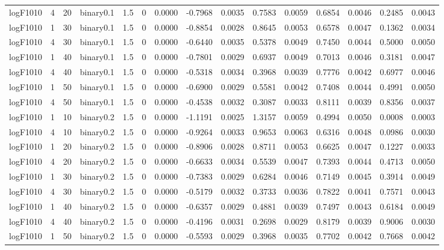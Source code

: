 \begin{longtable}{rrrrrrrrrrrrrrr}
  logF1010 & 4 & 20 & binary0.1 & 1.5 & 0 & 0.0000 & -0.7968 & 0.0035 & 0.7583 & 0.0059 & 0.6854 & 0.0046 & 0.2485 & 0.0043 \\ 
  logF1010 & 1 & 30 & binary0.1 & 1.5 & 0 & 0.0000 & -0.8854 & 0.0028 & 0.8645 & 0.0053 & 0.6578 & 0.0047 & 0.1362 & 0.0034 \\ 
  logF1010 & 4 & 30 & binary0.1 & 1.5 & 0 & 0.0000 & -0.6440 & 0.0035 & 0.5378 & 0.0049 & 0.7450 & 0.0044 & 0.5000 & 0.0050 \\ 
  logF1010 & 1 & 40 & binary0.1 & 1.5 & 0 & 0.0000 & -0.7801 & 0.0029 & 0.6937 & 0.0049 & 0.7013 & 0.0046 & 0.3181 & 0.0047 \\ 
  logF1010 & 4 & 40 & binary0.1 & 1.5 & 0 & 0.0000 & -0.5318 & 0.0034 & 0.3968 & 0.0039 & 0.7776 & 0.0042 & 0.6977 & 0.0046 \\ 
  logF1010 & 1 & 50 & binary0.1 & 1.5 & 0 & 0.0000 & -0.6900 & 0.0029 & 0.5581 & 0.0042 & 0.7408 & 0.0044 & 0.4991 & 0.0050 \\ 
  logF1010 & 4 & 50 & binary0.1 & 1.5 & 0 & 0.0000 & -0.4538 & 0.0032 & 0.3087 & 0.0033 & 0.8111 & 0.0039 & 0.8356 & 0.0037 \\ 
  logF1010 & 1 & 10 & binary0.2 & 1.5 & 0 & 0.0000 & -1.1191 & 0.0025 & 1.3157 & 0.0059 & 0.4994 & 0.0050 & 0.0008 & 0.0003 \\ 
  logF1010 & 4 & 10 & binary0.2 & 1.5 & 0 & 0.0000 & -0.9264 & 0.0033 & 0.9653 & 0.0063 & 0.6316 & 0.0048 & 0.0986 & 0.0030 \\ 
  logF1010 & 1 & 20 & binary0.2 & 1.5 & 0 & 0.0000 & -0.8906 & 0.0028 & 0.8711 & 0.0053 & 0.6625 & 0.0047 & 0.1227 & 0.0033 \\ 
  logF1010 & 4 & 20 & binary0.2 & 1.5 & 0 & 0.0000 & -0.6633 & 0.0034 & 0.5539 & 0.0047 & 0.7393 & 0.0044 & 0.4713 & 0.0050 \\ 
  logF1010 & 1 & 30 & binary0.2 & 1.5 & 0 & 0.0000 & -0.7383 & 0.0029 & 0.6284 & 0.0046 & 0.7149 & 0.0045 & 0.3914 & 0.0049 \\ 
  logF1010 & 4 & 30 & binary0.2 & 1.5 & 0 & 0.0000 & -0.5179 & 0.0032 & 0.3733 & 0.0036 & 0.7822 & 0.0041 & 0.7571 & 0.0043 \\ 
  logF1010 & 1 & 40 & binary0.2 & 1.5 & 0 & 0.0000 & -0.6357 & 0.0029 & 0.4881 & 0.0039 & 0.7497 & 0.0043 & 0.6184 & 0.0049 \\ 
  logF1010 & 4 & 40 & binary0.2 & 1.5 & 0 & 0.0000 & -0.4196 & 0.0031 & 0.2698 & 0.0029 & 0.8179 & 0.0039 & 0.9006 & 0.0030 \\ 
  logF1010 & 1 & 50 & binary0.2 & 1.5 & 0 & 0.0000 & -0.5593 & 0.0029 & 0.3968 & 0.0035 & 0.7702 & 0.0042 & 0.7668 & 0.0042 \\ 

\end{longtable}
